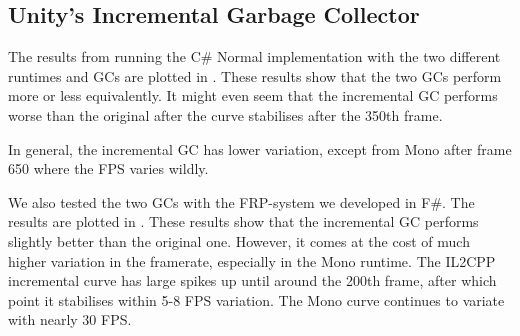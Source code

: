 
\subsection{Unity's Incremental Garbage Collector}
The results from running the C\# Normal implementation with the two different runtimes and \glspl{GC} are plotted in . These results show that the two \glspl{GC} perform more or less equivalently. It might even seem that the incremental \gls{GC} performs worse than the original after the curve stabilises after the 350th frame.

In general, the incremental \gls{GC} has lower variation, except from Mono after frame 650 where the \gls{FPS} varies wildly.


We also tested the two \glspl{GC} with the \gls{FRP}-system we developed in F\#. The results are plotted in . These results show that the incremental \gls{GC} performs slightly better than the original one. However, it comes at the cost of much higher variation in the framerate, especially in the Mono runtime. The IL2CPP incremental curve has large spikes up until around the 200th frame, after which point it stabilises within 5-8 \gls{FPS} variation. The Mono curve continues to variate with nearly 30 \gls{FPS}.

